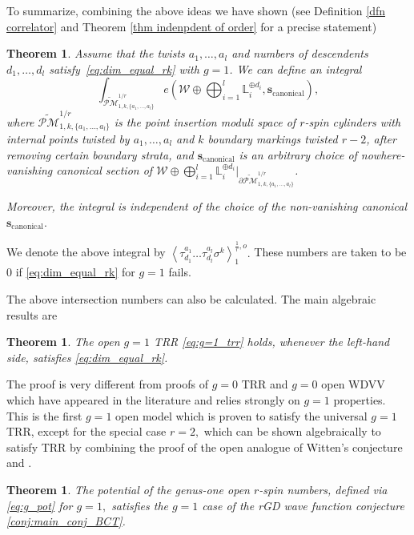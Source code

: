 \documentclass[11pt]{amsart}
\newtheorem{thm}[dummy]{Theorem}
\theoremstyle{definition}
\theoremstyle{remark}
\newcommand{\<}{\left<}
\renewcommand{\>}{\right>}
\numberwithin{equation}{section}
\begin{document}
To summarize, combining the above ideas we have shown (see Definition \ref{dfn correlator} and Theorem \ref{thm indenpdent of order} for a %
precise statement)
\begin{thm}\label{thm:int_nums_well_def}
Assume %
that the twists $a_1,\ldots,a_l$ and numbers of descendents $d_1,\ldots,d_l$ satisfy~\eqref{eq:dim_equal_rk} with $g=1$. We can define an integral
\[\int_{\widetilde{\mathcal{PM}}^{1/r}_{1,k,\{a_1, \ldots, a_l\}}} e\left( \mathcal{W} \oplus \bigoplus_{i=1}^l \mathbb{L}_i^{\oplus d_i}, \mathbf{s}_{\text{canonical}}\right),
\]
where ${\widetilde{\mathcal{PM}}^{1/r}_{1,k,\{a_1, \ldots, a_l\}}}$ is the point insertion moduli space of $r$-spin cylinders with internal points twisted by $a_1,\ldots,a_l$ and $k$ boundary markings twisted $r-2$, after removing certain boundary strata, and $\mathbf{s}_{\text{canonical}}$ is an arbitrary choice of nowhere-vanishing canonical section %
of $\mathcal{W} \oplus \bigoplus_{i=1}^l\mathbb{L}_i^{\oplus d_i}|_{\partial{\widetilde{\mathcal{PM}}^{1/r}_{1,k,\{a_1, \ldots, a_l\}}}}$. %

Moreover, the integral is independent of the choice of the non-vanishing canonical $\mathbf{s}_{\text{canonical}}.$ 
\end{thm}
We denote the above integral by $\left\langle\tau_{d_1}^{a_1}\ldots\tau^{a_l}_{d_l}\sigma^k\right\rangle^{\frac{1}{r},o}_1.$
These numbers are taken to be $0$ if \eqref{eq:dim_equal_rk} for $g=1$ fails.

The above intersection numbers can also be calculated. The main algebraic %
results are
\begin{thm}\label{thm:trr_g1}
The %
open $g=1$ TRR \eqref{eq:g=1_trr} holds, whenever the left-hand side, satisfies \eqref{eq:dim_equal_rk}.
\end{thm}
The proof is very different from proofs of $g=0$ TRR and $g=0$ open WDVV which have appeared in the literature \cite{PST14,BCT2,TZ2,solomon2023relative} %
and relies strongly %
on $g=1$ properties.
This is the first $g=1$ open model which is proven to satisfy the universal $g=1$ TRR, except for the special case $r=2,$ which can be shown algebraically to satisfy TRR by combining the proof of the open analogue of Witten's conjecture \cite{BT17} and \cite[Theorem 1]{BCT3}.
\begin{thm}\label{thm:wave_func}
    The potential of the genus-one open $r$-spin numbers, defined via \eqref{eq:g_pot} for $g=1,$ satisfies the $g=1$ case of the rGD wave function conjecture \ref{conj:main_conj_BCT}.
\end{thm}
\end{document}
